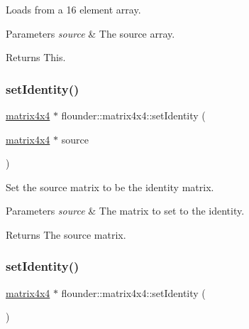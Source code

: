 Loads from a 16 element array. 


\begin{DoxyParams}{Parameters}
{\em source} & The source array. \\
\hline
\end{DoxyParams}
\begin{DoxyReturn}{Returns}
This. 
\end{DoxyReturn}
\mbox{\label{classflounder_1_1matrix4x4_a1e6d01f9949c6498de679e7db6c52aae}} 
\subsubsection{\texorpdfstring{set\+Identity()}{setIdentity()}\hspace{0.1cm}{\footnotesize\ttfamily [1/2]}}
{\footnotesize\ttfamily \hyperlink{classflounder_1_1matrix4x4}{matrix4x4} $\ast$ flounder\+::matrix4x4\+::set\+Identity (\begin{DoxyParamCaption}\item[{\hyperlink{classflounder_1_1matrix4x4}{matrix4x4} $\ast$}]{source }\end{DoxyParamCaption})\hspace{0.3cm}{\ttfamily [static]}}



Set the source matrix to be the identity matrix. 


\begin{DoxyParams}{Parameters}
{\em source} & The matrix to set to the identity. \\
\hline
\end{DoxyParams}
\begin{DoxyReturn}{Returns}
The source matrix. 
\end{DoxyReturn}
\mbox{\label{classflounder_1_1matrix4x4_a973b7975291890e5697255c95f4a252f}} 
\subsubsection{\texorpdfstring{set\+Identity()}{setIdentity()}\hspace{0.1cm}{\footnotesize\ttfamily [2/2]}}
{\footnotesize\ttfamily \hyperlink{classflounder_1_1matrix4x4}{matrix4x4} $\ast$ flounder\+::matrix4x4\+::set\+Identity (\begin{DoxyParamCaption}{ }\end{DoxyParamCaption})}




